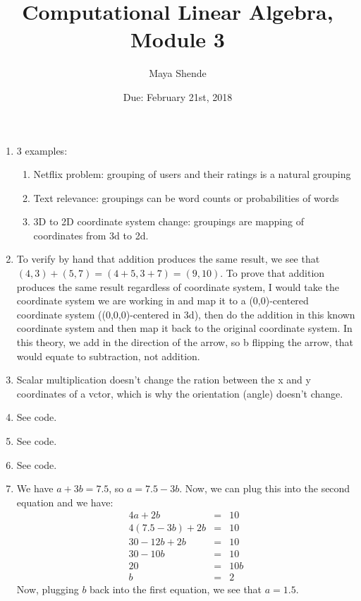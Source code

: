 \documentclass{article}
\title{Computational Linear Algebra, Module 3}
\author{Maya Shende}
\date{Due: February 21st, 2018}
\begin{document}
\maketitle

\begin{enumerate}
	
	\item 3 examples:
	\begin{enumerate}
		\item Netflix problem: grouping of users and their ratings is a natural grouping
		\item Text relevance: groupings can be word counts or probabilities of words 
		\item 3D to 2D coordinate system change: groupings are mapping of coordinates from 3d to 2d. 
	\end{enumerate}
	
	\item To verify by hand that addition produces the same result, we see that $(4,3) + (5,7) = (4+5,3+7) = (9,10)$. To prove that addition produces the same result regardless of coordinate system, I would take the coordinate system we are working in and map it to a (0,0)-centered coordinate system ((0,0,0)-centered in 3d), then do the addition in this known coordinate system and then map it back to the original coordinate system. In this theory, we add in the direction of the arrow, so b flipping the arrow, that would equate to subtraction, not addition. 
	
	\item Scalar multiplication doesn't change the ration between the x and y coordinates of a vctor, which is why the orientation (angle) doesn't change.
	
	\item See code.
	
	\item See code.
	
	\item See code.
	
	\item We have $a + 3b = 7.5$, so $a = 7.5-3b$. Now, we can plug this into the second equation and we have:
	\begin{eqnarray*}
		4a+2b &=& 10\\
		4(7.5-3b)+2b &=& 10\\
		30-12b+2b &=& 10\\
		30-10b&=&10\\
		20&=&10b\\
		b&=&2
	\end{eqnarray*}
	Now, plugging $b$ back into the first equation, we see that $a=1.5$. 
	

\end{enumerate}
\end{document}
